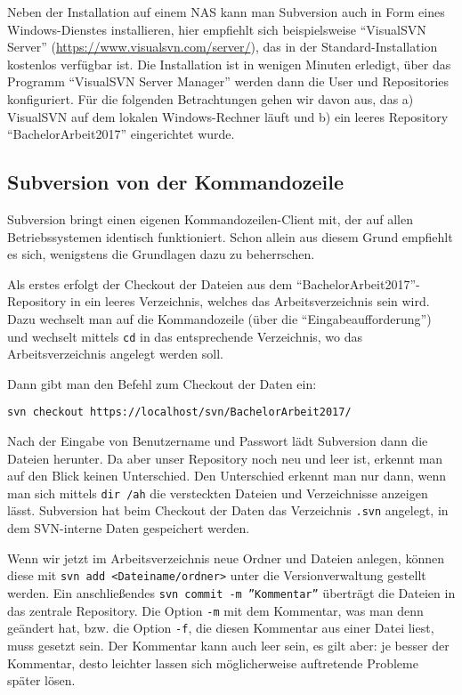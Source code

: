 Neben der Installation auf einem NAS kann man Subversion auch in Form eines Windows-Dienstes installieren, hier empfiehlt sich beispielsweise \enquote{VisualSVN Server} (\url{https://www.visualsvn.com/server/}), das in der Standard-Installation kostenlos verfügbar ist. Die Installation ist in wenigen Minuten erledigt, über das Programm \enquote{VisualSVN Server Manager} werden dann die User und Repositories konfiguriert. Für die folgenden Betrachtungen gehen wir davon aus, das a) VisualSVN auf dem lokalen Windows-Rechner läuft und b) ein leeres Repository \enquote{BachelorArbeit2017} eingerichtet wurde.


\subsection{Subversion von der Kommandozeile}

Subversion bringt einen eigenen Kommandozeilen-Client mit, der auf allen Betriebssystemen identisch funktioniert. 
Schon allein aus diesem Grund empfiehlt es sich, wenigstens die Grundlagen dazu zu beherrschen.

Als erstes erfolgt der Checkout der Dateien aus dem \enquote{BachelorArbeit2017}-Repository in ein leeres Verzeichnis, welches das Arbeitsverzeichnis sein wird. 
Dazu wechselt man auf die Kommandozeile (über die \enquote{Eingabeaufforderung}) und wechselt mittels \texttt{cd} in das entsprechende Verzeichnis, wo das Arbeitsverzeichnis angelegt werden soll.

Dann gibt man den Befehl zum Checkout der Daten ein:

\texttt{svn checkout https://localhost/svn/BachelorArbeit2017/}

Nach der Eingabe von Benutzername und Passwort lädt Subversion dann die Dateien herunter. 
Da aber unser Repository noch neu und leer ist, erkennt man auf den Blick keinen Unterschied. 
Den Unterschied erkennt man nur dann, wenn man sich mittels \texttt{dir /ah} die versteckten Dateien und Verzeichnisse anzeigen lässt. 
Subversion hat beim Checkout der Daten das Verzeichnis \texttt{.svn} angelegt, in dem SVN-interne Daten gespeichert werden. 

Wenn wir jetzt im Arbeitsverzeichnis neue Ordner und Dateien anlegen, können diese mit \texttt{svn add <Dateiname/ordner>} unter die Versionverwaltung gestellt werden. 
Ein anschließendes \texttt{svn commit -m ''Kommentar''} überträgt die Dateien in das zentrale Repository.
Die Option \texttt{-m} mit dem Kommentar, was man denn geändert hat, bzw. die Option \texttt{-f}, die diesen Kommentar aus einer Datei liest, muss gesetzt sein. Der Kommentar kann auch leer sein, es gilt aber: je besser der Kommentar, desto leichter lassen sich möglicherweise auftretende Probleme später lösen.

